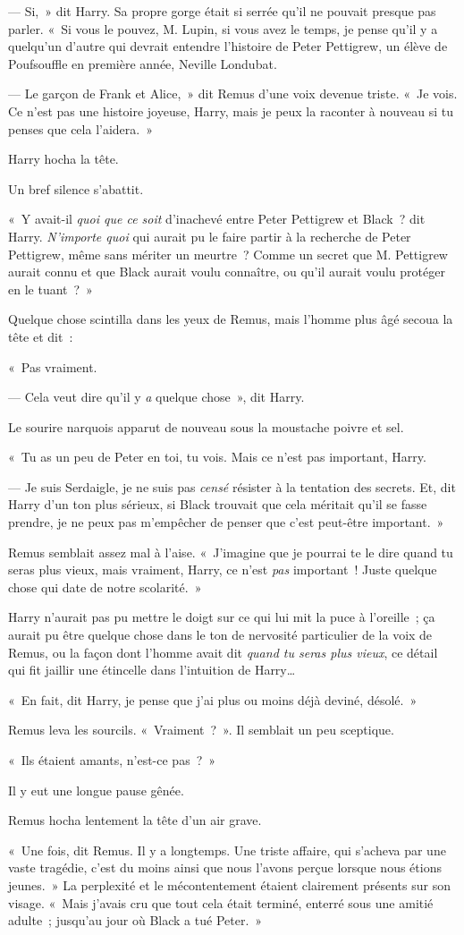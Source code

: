 --- Si,~» dit Harry. Sa propre gorge était si serrée qu'il ne pouvait presque pas parler. «~Si vous le pouvez, M. Lupin, si vous avez le temps, je pense qu'il y a quelqu'un d'autre qui devrait entendre l'histoire de Peter Pettigrew, un élève de Poufsouffle en première année, Neville Londubat.

--- Le garçon de Frank et Alice,~» dit Remus d'une voix devenue triste. «~Je vois. Ce n'est pas une histoire joyeuse, Harry, mais je peux la raconter à nouveau si tu penses que cela l'aidera.~»

Harry hocha la tête.

Un bref silence s'abattit.

«~Y avait-il \emph{quoi que ce soit} d'inachevé entre Peter Pettigrew et Black~? dit Harry. \emph{N'importe quoi} qui aurait pu le faire partir à la recherche de Peter Pettigrew, même sans mériter un meurtre~? Comme un secret que M. Pettigrew aurait connu et que Black aurait voulu connaître, ou qu'il aurait voulu protéger en le tuant~?~»

Quelque chose scintilla dans les yeux de Remus, mais l'homme plus âgé secoua la tête et dit~:

«~Pas vraiment.

--- Cela veut dire qu'il y \emph{a} quelque chose~», dit Harry.

Le sourire narquois apparut de nouveau sous la moustache poivre et sel.

«~Tu as un peu de Peter en toi, tu vois. Mais ce n'est pas important, Harry.

--- Je suis Serdaigle, je ne suis pas \emph{censé} résister à la tentation des secrets. Et, dit Harry d'un ton plus sérieux, si Black trouvait que cela méritait qu'il se fasse prendre, je ne peux pas m'empêcher de penser que c'est peut-être important.~»

Remus semblait assez mal à l'aise. «~J'imagine que je pourrai te le dire quand tu seras plus vieux, mais vraiment, Harry, ce n'est \emph{pas} important~! Juste quelque chose qui date de notre scolarité.~»

Harry n'aurait pas pu mettre le doigt sur ce qui lui mit la puce à l'oreille~; ça aurait pu être quelque chose dans le ton de nervosité particulier de la voix de Remus, ou la façon dont l'homme avait dit \emph{quand tu seras plus vieux}, ce détail qui fit jaillir une étincelle dans l'intuition de Harry…

«~En fait, dit Harry, je pense que j'ai plus ou moins déjà deviné, désolé.~»

Remus leva les sourcils. «~Vraiment~?~». Il semblait un peu sceptique.

«~Ils étaient amants, n'est-ce pas~?~»

Il y eut une longue pause gênée.

Remus hocha lentement la tête d'un air grave.

«~Une fois, dit Remus. Il y a longtemps. Une triste affaire, qui s'acheva par une vaste tragédie, c'est du moins ainsi que nous l'avons perçue lorsque nous étions jeunes.~» La perplexité et le mécontentement étaient clairement présents sur son visage. «~Mais j'avais cru que tout cela était terminé, enterré sous une amitié adulte~; jusqu'au jour où Black a tué Peter.~»
